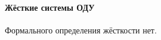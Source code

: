\documentclass{trlnotes}
\begin{document}


\paragraph{Жёсткие системы ОДУ}
\label{par:ode::stiff}

\begin{defn}\label{def:ode::stiff}
  Формального определения жёсткости нет. 
\end{defn}
\end{document}
